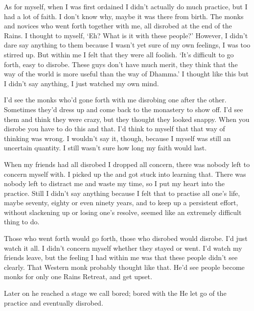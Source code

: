 As for myself, when I was first ordained I didn't actually do much practice, but I had a lot of faith. I don't know why, maybe it was there from birth. The monks and novices who went forth together with me, all disrobed at the end of the Rains. I thought to myself, `Eh? What is it with these people?' However, I didn't dare say anything to them because I wasn't yet sure of my own feelings, I was too stirred up. But within me I felt that they were all foolish. `It's difficult to go forth, easy to disrobe. These guys don't have much merit, they think that the way of the world is more useful than the way of Dhamma.' I thought like this but I didn't say anything, I just watched my own mind. 

I'd see the monks who'd gone forth with me disrobing one after the other. Sometimes they'd dress up and come back to the monastery to show off. I'd see them and think they were crazy, but they thought they looked snappy. When you disrobe you have to do this and that. I'd think to myself that that way of thinking was wrong. I wouldn't say it, though, because I myself was still an uncertain quantity. I still wasn't sure how long my faith would last. 

When my friends had all disrobed I dropped all concern, there was nobody left to concern myself with. I picked up the  and got stuck into learning that. There was nobody left to distract me and waste my time, so I put my heart into the practice. Still I didn't say anything because I felt that to practise all one's life, maybe seventy, eighty or even ninety years, and to keep up a persistent effort, without slackening up or losing one's resolve, seemed like an extremely difficult thing to do. 

Those who went forth would go forth, those who disrobed would disrobe. I'd just watch it all. I didn't concern myself whether they stayed or went. I'd watch my friends leave, but the feeling I had within me was that these people didn't see clearly. That Western monk probably thought like that. He'd see people become monks for only one Rains Retreat, and get upset. 

Later on he reached a stage we call bored; bored with the  He let go of the practice and eventually disrobed. 


